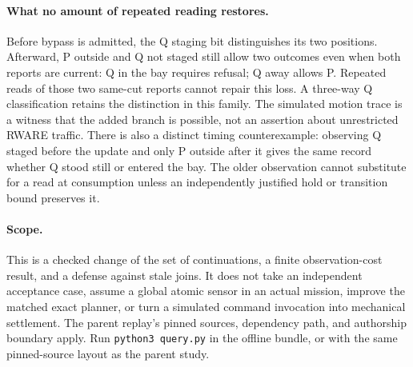 \documentclass{article}
\begin{document}
\paragraph{What no amount of repeated reading restores.}
Before bypass is admitted, the Q staging bit distinguishes its
two positions. Afterward, P outside and Q not staged still allow
two outcomes even when both reports are current: Q in the bay
requires refusal; Q away allows P. Repeated reads of those two
same-cut reports cannot repair this loss. A three-way Q
classification retains the distinction in this family. The
simulated motion trace is a witness that the added branch is
possible, not an assertion about unrestricted RWARE traffic.
There is also a distinct timing counterexample: observing Q
staged before the update and only P outside after it gives the
same record whether Q stood still or entered the bay. The older
observation cannot substitute for a read at consumption unless
an independently justified hold or transition bound preserves it.

\paragraph{Scope.}
This is a checked change of the set of continuations, a finite
observation-cost result, and a defense against stale joins. It
does not take an independent acceptance case, assume a global
atomic sensor in an actual mission, improve the matched exact
planner, or turn a simulated command invocation into mechanical
settlement. The parent replay's pinned sources, dependency path,
and authorship boundary apply. Run \texttt{python3 query.py} in the
offline bundle, or with the same pinned-source layout as the
parent study.
\end{document}
